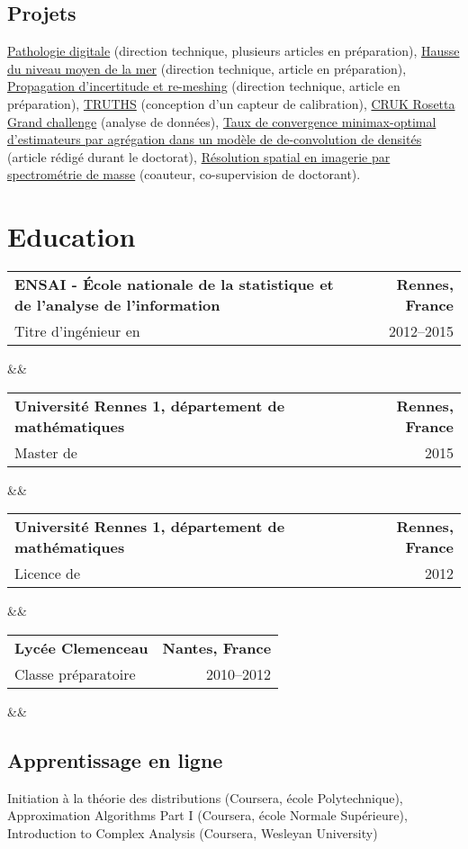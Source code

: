 \documentclass[11pt,a4paper,sans,colorlinks,linkcolor=blue]{moderncv} %
\makeatletter
\renewcommand*{\cventry}[7][.25em]{
\begin{tabular*}{\textwidth}{l@{\extracolsep{\fill}}r}%
{\bfseries #4} & {\bfseries #5} \\%
{#3\ifthenelse{\equal{#6}{}}{}{#6}}&{#2}\\%
\end{tabular*}%
\ifx&#7&%
\else{\\\vbox{\small#7}}\fi%
\par\addvspace{#1}}
\makeatother
\begin{document}
\subsection{Projets}
\href{https://www.npl.co.uk/news/next-generation-of-digital-pathology}{Pathologie digitale} (direction technique, plusieurs articles en préparation),
\href{https://www.bipmwmo22.org/submissions/submission/137}{Hausse du niveau moyen de la mer} (direction technique, article en préparation),
\href{https://www.bipmwmo22.org/submissions/submission/138}{Propagation d'incertitude et re-meshing} (direction technique, article en préparation),
\href{https://www.npl.co.uk/earth-observation/truths}{TRUTHS} (conception d'un capteur de calibration),
\href{https://www.npl.co.uk/grand-challenge}{CRUK Rosetta Grand challenge} (analyse de données),
\href{https://arxiv.org/pdf/2102.01037}{Taux de convergence minimax-optimal d'estimateurs par agrégation dans un modèle de de-convolution de densités} (article rédigé durant le doctorat),
\href{https://pubs.acs.org/doi/abs/10.1021/acs.analchem.1c02470}{Résolution spatial en imagerie par spectrométrie de masse} (coauteur, co-supervision de doctorant).


\section{Education}
\cventry{2012--2015}{Titre d'ingénieur en }{ENSAI - École nationale de la statistique et de l'analyse de l'information}{Rennes, France}{génie statistique;}{}
\cventry{2015}{Master de }{Université Rennes 1, département de mathématiques}{Rennes, France}{statistique mathématique;}{}  %
\cventry{2012}{Licence de }{Université Rennes 1, département de mathématiques}{Rennes, France}{mathématiques;}{}
\cventry{2010--2012}{Classe préparatoire}{Lycée Clemenceau}{Nantes, France}{Filière MPSI - MP}{}

\medskip

\subsection{Apprentissage en ligne}
Initiation à la théorie des distributions (Coursera, école Polytechnique),
Approximation Algorithms Part I (Coursera, école Normale Supérieure),
Introduction to Complex Analysis (Coursera, Wesleyan University)
\end{document}
